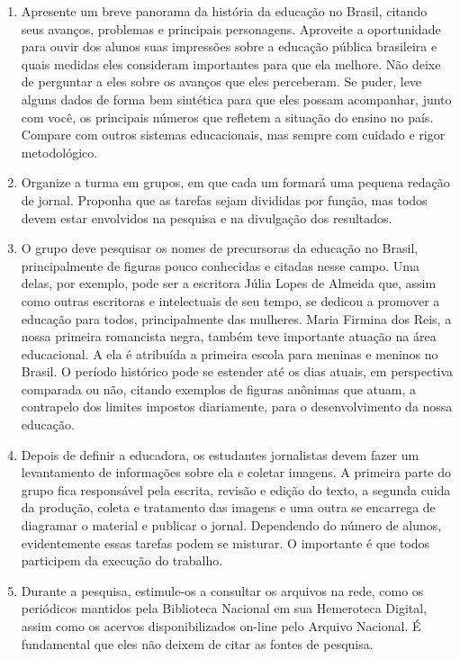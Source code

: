 \documentclass[12pt]{extarticle}
\begin{document}
\begin{enumerate}
\item
Apresente um breve panorama da história da
educação no Brasil, citando seus avanços, problemas e principais
personagens. Aproveite a oportunidade para ouvir dos alunos suas
impressões sobre a educação pública brasileira e quais medidas eles
consideram importantes para que ela melhore. Não deixe de perguntar a
eles sobre os avanços que eles perceberam. Se puder, leve alguns dados
de forma bem sintética para que eles possam acompanhar, junto com você,
os principais números que refletem a situação do ensino no país. Compare
com outros sistemas educacionais, mas sempre com cuidado e rigor
metodológico.

\item
Organize a turma em grupos, em que cada um formará uma pequena
redação de jornal. Proponha que as tarefas sejam divididas por função,
mas todos devem estar envolvidos na pesquisa e na divulgação dos
resultados.

\item
O grupo deve pesquisar os nomes de precursoras da educação no Brasil,
principalmente de figuras pouco conhecidas e citadas nesse campo. Uma
delas, por exemplo, pode ser a escritora Júlia Lopes de Almeida que,
assim como outras escritoras e intelectuais de seu tempo, se dedicou a
promover a educação para todos, principalmente das mulheres. Maria
Firmina dos Reis, a nossa primeira romancista negra, também teve
importante atuação na área educacional. A ela é atribuída a primeira
escola para meninas e meninos no Brasil. O período histórico pode se
estender até os dias atuais, em perspectiva comparada ou não, citando
exemplos de figuras anônimas que atuam, a contrapelo dos limites
impostos diariamente, para o desenvolvimento da nossa educação.

\item
Depois de definir a educadora, os estudantes jornalistas devem fazer
um levantamento de informações sobre ela e coletar imagens. A primeira
parte do grupo fica responsável pela escrita, revisão e edição do texto,
a segunda cuida da produção, coleta e tratamento das imagens e uma outra
se encarrega de diagramar o material e publicar o jornal. Dependendo do
número de alunos, evidentemente essas tarefas podem se misturar. O
importante é que todos participem da execução do trabalho.

\item
Durante a pesquisa, estimule-os a consultar os arquivos na rede, como
os periódicos mantidos pela Biblioteca Nacional em sua Hemeroteca
Digital, assim como os acervos disponibilizados on-line pelo Arquivo
Nacional. É fundamental que eles não deixem de citar as fontes de
pesquisa.
\end{enumerate}
\end{document}
